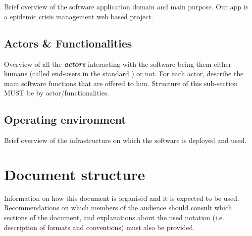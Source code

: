 \section{\mysystemname}
Brief overview of the software application domain and main purpose.
Our app is a epidemic crisis management web based project. 

\subsection{Actors \& Functionalities}
Overview of all the \textbf{\emph{\glspl{actor}}} interacting with the software
being them either humans (called end-users in the standard
\cite{IEEE-2001-userdocumentation}) or not. For each actor, describe the main
software functions that are offered to him. Structure of this sub-section MUST
be by actor/functionalities.


\subsection{Operating environment}
Brief overview of the infrastructure on which the software is deployed and used.

\section{Document structure}  
Information on how this document is organised and it is expected to be
used. Recommendations on which members of the audience
should consult which sections of the document, and explanations about the used
notation (i.e. description of formats and conventions) must also be provided.





